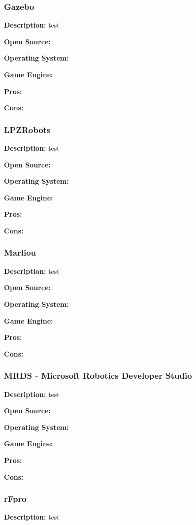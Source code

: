 \subsubsection{Gazebo}
\textbf{Description:} test

\textbf{Open Source:}

\textbf{Operating System:}

\textbf{Game Engine:}

\textbf{Pros:}

\textbf{Cons:}


\subsubsection{LPZRobots}
\textbf{Description:} test

\textbf{Open Source:}

\textbf{Operating System:}

\textbf{Game Engine:}

\textbf{Pros:}

\textbf{Cons:}

\subsubsection{Marliou}
\textbf{Description:} test

\textbf{Open Source:}

\textbf{Operating System:}

\textbf{Game Engine:}

\textbf{Pros:}

\textbf{Cons:}

\subsubsection{MRDS - Microsoft Robotics Developer Studio}
\textbf{Description:} test

\textbf{Open Source:}

\textbf{Operating System:}

\textbf{Game Engine:}

\textbf{Pros:}

\textbf{Cons:}


\subsubsection{rFpro}
\textbf{Description:} test

